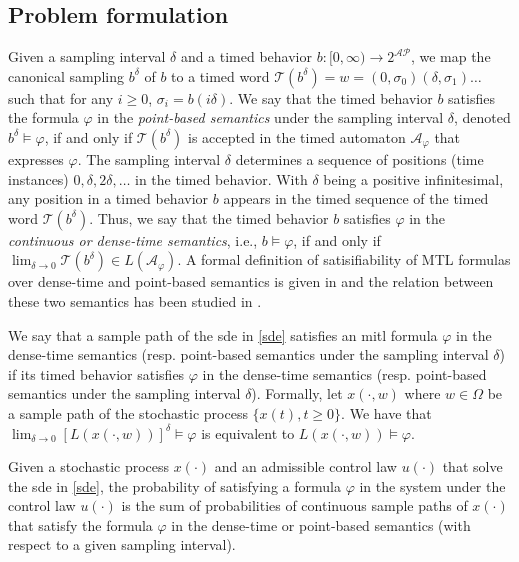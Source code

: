 \documentclass[letterpaper, 10 pt, conference]{ieeeconf}
\newcommand{\calA}{\mathcal{A}}
\newcommand{\calT}{\mathcal{T}}
\newcommand{\calAP}{\mathcal{AP}}
\begin{document}
\subsection{Problem formulation}
Given a sampling interval $\delta$ and a timed behavior
$b:[0,\infty)\rightarrow 2^{\calAP}$, we map the canonical sampling
$b^{\delta}$ of $b$ to a timed word
$ \calT(b^\delta) = w= (0,\sigma_0)(\delta, \sigma_1) \ldots$ such
that for any $i\ge 0$, $\sigma_i = b(i\delta)$. We say that the timed
behavior $b$ satisfies the formula $\varphi$ in the \emph{point-based
  semantics} under the sampling interval $\delta$, denoted
$b^\delta \models \varphi$, if and only if $\calT(b^\delta)$ is
accepted in the timed automaton $\calA_\varphi$ that expresses
$\varphi$. The sampling interval $\delta$
determines a sequence of positions (time instances) $0,
\delta, 2\delta,\ldots$ in the timed behavior. With $\delta
$ being a positive infinitesimal, any position in a timed behavior
$b$
appears in the timed sequence of the timed word $\calT(
b^\delta)$. Thus, we say that the timed behavior
$b$
satisfies $\varphi$
in the \emph{continuous or dense-time semantics}, i.e., $b\models
\varphi$, if and only if $ \lim_{\delta\rightarrow 0}
\calT(b^\delta)\in
L(\calA_\varphi)$. A formal definition of satisifiability of MTL
formulas over dense-time and point-based semantics is given in
\cite{Bouyer2009} and the relation between these two semantics has
been studied in \cite{Furia2006}.










We say that a sample path of the \ac{sde} in \eqref{sde} satisfies an
\ac{mitl} formula $\varphi$ in the dense-time semantics
(resp. point-based semantics under the sampling interval $\delta$) if
its timed behavior satisfies $\varphi$ in the dense-time semantics
(resp. point-based semantics under the sampling interval
$\delta$). Formally, let $x(\cdot, w)$ where $w\in \Omega$ be a sample
path of the stochastic process $\{ x(t), t \ge 0 \}$. We have that
$\lim_{\delta\rightarrow 0} [L(x(\cdot,w))]^\delta \models \varphi$ is
equivalent to $L(x(\cdot,w)) \models \varphi$.







Given a stochastic process $x(\cdot)$ and an admissible control law
$u(\cdot)$ that solve the \ac{sde} in \eqref{sde}, the probability of
satisfying a formula $\varphi$ in the system under the control law
$u(\cdot)$ is the sum of probabilities of continuous sample paths of
$x(\cdot)$ that satisfy the formula $\varphi$ in the dense-time or
point-based semantics (with respect to a given sampling interval).
\end{document}
